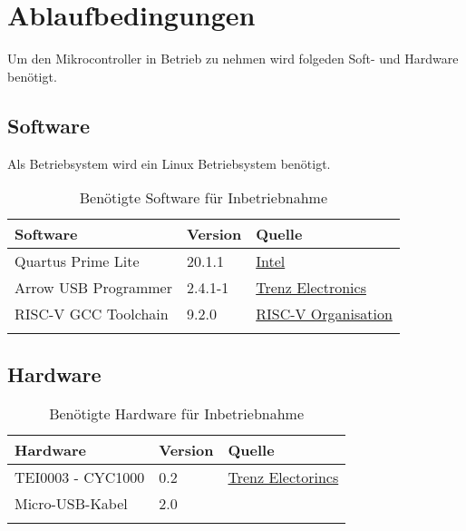 \section{Ablaufbedingungen}
    Um den Mikrocontroller in Betrieb zu nehmen wird folgeden Soft- und Hardware benötigt.
   

    \subsection{Software}
        Als Betriebsystem wird ein Linux Betriebsystem benötigt.
        \begin{center}
            \begin{longtable}{| l | l | l |}
                \hline
                    Software & Version & Quelle \\
                \hline
                    Quartus Prime Lite & 20.1.1 & \href{https://fpgasoftware.intel.com/?edition=lite}{Intel}\\
                \hline
                    Arrow USB Programmer & 2.4.1-1 & \href{https://wiki.trenz-electronic.de/display/PD/Arrow+USB+Programmer#ArrowUSBProgrammer-DownloadSetupFiles}{Trenz Electronics}\\
                \hline
                    RISC-V GCC Toolchain & 9.2.0 & \href{https://github.com/riscv/riscv-gnu-toolchain}{RISC-V Organisation}\\
                \hline
                \caption{Benötigte Software für Inbetriebnahme}
            \end{longtable}
        \end{center}

    \subsection{Hardware}
        \begin{center}
            \begin{longtable}{| l | l | l |}
                \hline
                    Hardware & Version & Quelle \\
                \hline
                    TEI0003 - CYC1000 & 0.2 & \href{https://wiki.trenz-electronic.de/display/PD/TEI0003+Getting+Started}{Trenz Electorincs}\\
                \hline
                    Micro-USB-Kabel & 2.0 & \\
                \hline
                \caption{Benötigte Hardware für Inbetriebnahme}
            \end{longtable}
        \end{center}